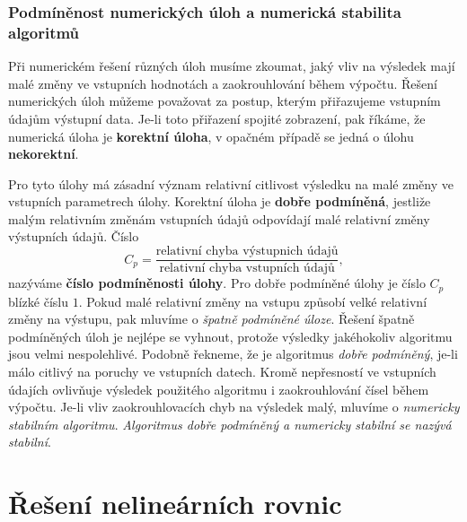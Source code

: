       \subsubsection{Podmíněnost numerických úloh a numerická stabilita algoritmů}
        Při numerickém řešení různých úloh musíme zkoumat, jaký vliv na výsledek mají malé změny ve
        vstupních hodnotách a zaokrouhlování během výpočtu. Řešení numerických úloh můžeme považovat
        za postup, kterým přiřazujeme vstupním údajům výstupní data. Je-li toto přiřazení spojité
        zobrazení, pak říkáme, že numerická úloha je \textbf{korektní úloha}, v opačném případě se
        jedná o úlohu \textbf{nekorektní}.
  
        Pro tyto úlohy má zásadní význam relativní citlivost výsledku na malé změny ve vstupních
        parametrech úlohy. Korektní úloha je \textbf{dobře pod\-mí\-ně\-ná}, jestliže malým
        relativním změnám vstupních údajů odpovídají malé relativní změny výstupních údajů. Číslo
        \begin{equation}\label{nm:eq_podminenost}
          C_p=\frac{\text{relativní chyba výstupnich údajů}}{\text{relativní chyba vstupních
              údajů}},
        \end{equation}
        nazýváme \textbf{číslo podmíněnosti úlohy}. Pro dobře podmíněné úlohy je číslo $C_p$ blízké
        číslu $1$. Pokud malé relativní změny na vstupu způsobí velké relativní změny na výstupu, 
        pak  mluvíme o \emph{špatně podmíněné úloze}. Řešení špatně podmíněných úloh je nejlépe se
        vyhnout, protože výsledky jakéhokoliv algoritmu jsou velmi nespolehlivé. Podobně řekneme, že
        je algoritmus \emph{dobře pod\-mí\-ně\-ný}, je-li málo citlivý na poruchy ve vstupních
        datech. Kromě ne\-přes\-ností ve vstupních údajích ovlivňuje výsledek použitého algoritmu i
        zaokrouhlování čísel během výpočtu. Je-li vliv zaokrouhlovacích chyb na výsledek malý,
        mluvíme o \emph{numericky stabilním algoritmu}. \emph{Algoritmus dobře pod\-mí\-ně\-ný a
        numericky stabilní se nazývá stabilní}.
  
  \section{Řešení nelineárních rovnic}
